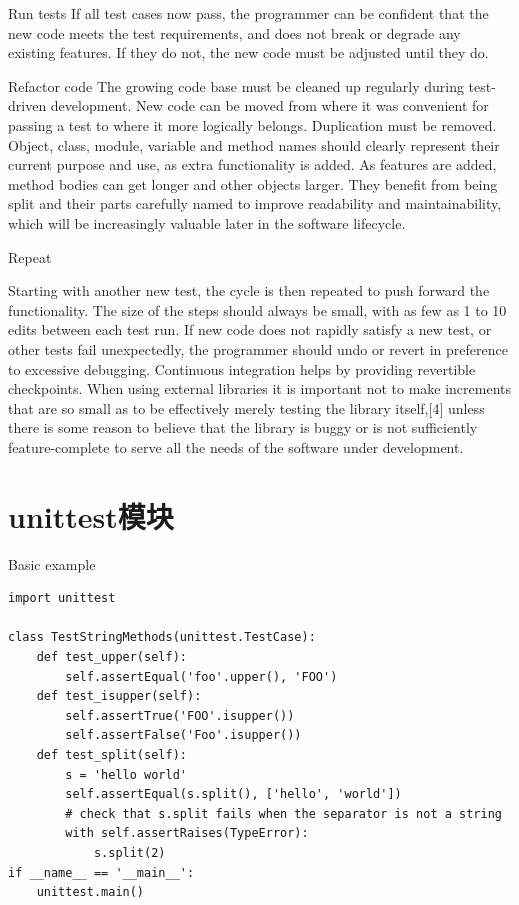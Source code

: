 \documentclass{beamer}
\begin{document}
\begin{frame}[t]{Run tests}
If all test cases now pass, the programmer can be confident that the new code meets the test requirements, and does not break or degrade any existing features. If they do not, the new code must be adjusted until they do.
    
\end{frame}


\begin{frame}[t]{Refactor code}
The growing code base must be cleaned up regularly during test-driven development. New code can be moved from where it was convenient for passing a test to where it more logically belongs. Duplication must be removed. Object, class, module, variable and method names should clearly represent their current purpose and use, as extra functionality is added. As features are added, method bodies can get longer and other objects larger. They benefit from being split and their parts carefully named to improve readability and maintainability, which will be increasingly valuable later in the software lifecycle. 
    
\end{frame}


\begin{frame}[t]{Repeat}
    
Starting with another new test, the cycle is then repeated to push forward the functionality. The size of the steps should always be small, with as few as 1 to 10 edits between each test run. If new code does not rapidly satisfy a new test, or other tests fail unexpectedly, the programmer should undo or revert in preference to excessive debugging. Continuous integration helps by providing revertible checkpoints. When using external libraries it is important not to make increments that are so small as to be effectively merely testing the library itself,[4] unless there is some reason to believe that the library is buggy or is not sufficiently feature-complete to serve all the needs of the software under development.
\end{frame}
\section{unittest模块} %
\label{sec:unittest模块}



\begin{frame}[t,fragile]{Basic example}

\footnotesize
\begin{verbatim}
import unittest

class TestStringMethods(unittest.TestCase):
    def test_upper(self):
        self.assertEqual('foo'.upper(), 'FOO')
    def test_isupper(self):
        self.assertTrue('FOO'.isupper())
        self.assertFalse('Foo'.isupper())
    def test_split(self):
        s = 'hello world'
        self.assertEqual(s.split(), ['hello', 'world'])
        # check that s.split fails when the separator is not a string
        with self.assertRaises(TypeError):
            s.split(2)
if __name__ == '__main__':
    unittest.main()
\end{verbatim}


\end{frame}
\end{document}
